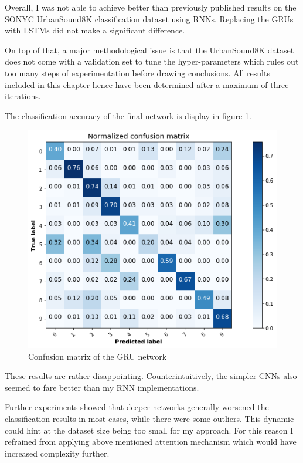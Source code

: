 Overall, I was not able to achieve better than previously published results on the SONYC UrbanSound8K classification dataset using RNNs. Replacing the GRUs with LSTMs did not make a significant difference.

On top of that, a major methodological issue is that the UrbanSound8K dataset does not come with a validation set to tune the hyper-parameters which rules out too many steps of experimentation before drawing conclusions. All results included in this chapter hence have been determined after a maximum of three iterations.

The classification accuracy of the final network is display in figure \ref{fig:cfcnn}.

\begin{figure}[h]
    \centering
    \vspace{15pt}
	\includegraphics[width=.8\textwidth]{./images/illustrations/confusion-cnn}
    \caption{Confusion matrix of the GRU network}
    \label{fig:cfcnn}
    \vspace{10pt}
\end{figure}




These results are rather disappointing. Counterintuitively, the simpler CNNs also seemed to fare better than my RNN implementations.

Further experiments showed that deeper networks generally worsened the classification results in most cases, while there were some outliers. This dynamic could hint at the dataset size being too small for my approach. For this reason I refrained from applying above mentioned attention mechanism which would have increased complexity further.

